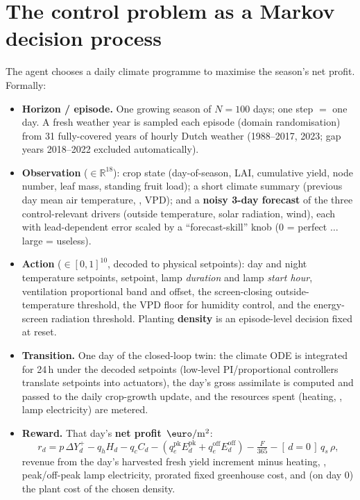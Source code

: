 \documentclass[11pt,a4paper]{article}
\newcommand{\eur}{\,\text{\euro}/\si{m^2}}
\begin{document}
\section{The control problem as a Markov decision process}
The agent chooses a daily climate programme to maximise the season's net profit. Formally:
\begin{itemize}[leftmargin=1.6em,itemsep=1pt]
  \item \textbf{Horizon / episode.} One growing season of $N=100$ days; one step $=$ one day. A fresh
  weather year is sampled each episode (domain randomisation) from 31 fully-covered years of hourly
  Dutch weather (1988--2017, 2023; gap years 2018--2022 excluded automatically).
  \item \textbf{Observation} ($\in\mathbb{R}^{18}$): crop state (day-of-season, LAI, cumulative yield,
  node number, leaf mass, standing fruit load); a short climate summary (previous day mean air
  temperature, , VPD); and a \textbf{noisy 3-day forecast} of the three control-relevant
  drivers (outside temperature, solar radiation, wind), each with lead-dependent error scaled by a
  ``forecast-skill'' knob (0 = perfect $\dots$ large = useless).
  \item \textbf{Action} ($\in[0,1]^{10}$, decoded to physical setpoints): day and night temperature
  setpoints,  setpoint, lamp \emph{duration} and lamp \emph{start hour}, ventilation
  proportional band and offset, the screen-closing outside-temperature threshold, the VPD floor for
  humidity control, and the energy-screen radiation threshold. Planting \textbf{density} is an
  episode-level decision fixed at reset.
  \item \textbf{Transition.} One day of the closed-loop twin: the climate ODE is integrated for 24\,h
  under the decoded setpoints (low-level PI/proportional controllers translate setpoints into
  actuators), the day's gross assimilate is computed and passed to the daily crop-growth update, and
  the resources spent (heating, , lamp electricity) are metered.
  \item \textbf{Reward.} That day's \textbf{net profit} $\eur$:
  \[
    r_d = p\,\Delta Y_d^{+} - q_h H_d - q_c C_d - (q_e^{\text{pk}}E_d^{\text{pk}} + q_e^{\text{off}}E_d^{\text{off}}) - \tfrac{F}{365} - [\,d\!=\!0\,]\,q_s\,\rho,
  \]
  revenue from the day's harvested fresh yield increment minus heating, , peak/off-peak lamp
  electricity, prorated fixed greenhouse cost, and (on day 0) the plant cost of the chosen density.
\end{itemize}
\end{document}
